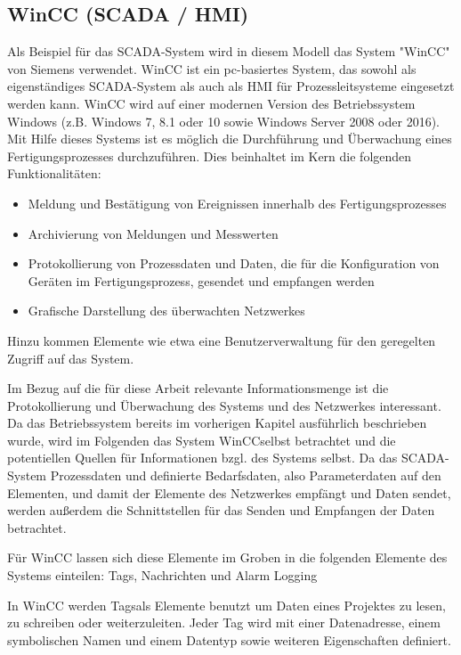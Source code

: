 \subsection{WinCC (SCADA / HMI)}
Als Beispiel für das SCADA-System wird in diesem Modell das System "WinCC" von Siemens verwendet. WinCC ist ein pc-basiertes System, das sowohl als eigenständiges SCADA-System als auch als HMI für Prozessleitsysteme eingesetzt werden kann. WinCC wird auf einer modernen Version des Betriebssystem Windows (z.B. Windows 7, 8.1 oder 10 sowie Windows Server 2008 oder 2016). Mit Hilfe dieses Systems ist es möglich die Durchführung und Überwachung eines Fertigungsprozesses durchzuführen. Dies beinhaltet im Kern die folgenden Funktionalitäten:
\begin{itemize}
\item Meldung und Bestätigung von Ereignissen innerhalb des Fertigungsprozesses
\item Archivierung von Meldungen und Messwerten
\item Protokollierung von Prozessdaten und Daten, die für die Konfiguration von Geräten im Fertigungsprozess, gesendet und empfangen werden
\item Grafische Darstellung des überwachten Netzwerkes
\end{itemize}

Hinzu kommen Elemente wie etwa eine Benutzerverwaltung für den geregelten Zugriff auf das System.

Im Bezug auf die für diese Arbeit relevante Informationsmenge ist die Protokollierung und Überwachung des Systems und des Netzwerkes interessant. Da das Betriebssystem bereits im vorherigen Kapitel ausführlich beschrieben wurde, wird im Folgenden das System \glqq WinCC\grqq  selbst betrachtet und die potentiellen Quellen für Informationen bzgl. des Systems selbst. Da das SCADA-System Prozessdaten und definierte Bedarfsdaten, also Parameterdaten auf den Elementen, und damit der Elemente des Netzwerkes empfängt und Daten sendet, werden außerdem die Schnittstellen für das Senden und Empfangen der Daten betrachtet.

Für WinCC lassen sich diese Elemente im Groben in die folgenden Elemente des Systems einteilen: Tags, Nachrichten und Alarm Logging


In WinCC werden \glqq Tags\grqq  als Elemente benutzt um Daten eines Projektes zu lesen, zu schreiben oder weiterzuleiten. Jeder Tag wird mit einer Datenadresse, einem symbolischen Namen und einem Datentyp sowie weiteren Eigenschaften definiert.

